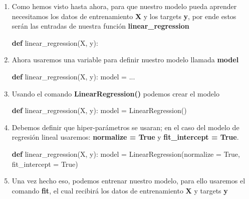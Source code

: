 \documentclass[11pt]{article}
\newenvironment{Shaded}{}{}
\newcommand{\KeywordTok}[1]{\textcolor[rgb]{0.00,0.44,0.13}{\textbf{{#1}}}}
\newcommand{\NormalTok}[1]{{#1}}
\newcommand{\VariableTok}[1]{\textcolor[rgb]{0.10,0.09,0.49}{{#1}}}
\newcommand{\OperatorTok}[1]{\textcolor[rgb]{0.40,0.40,0.40}{{#1}}}
\begin{document}
\begin{enumerate}
\def\labelenumi{\arabic{enumi}.}
\setcounter{enumi}{1}
\item
  Como hemos visto hasta ahora, para que nuestro modelo pueda aprender
  necesitamos los datos de entrenamiento \textbf{X} y los targets
  \textbf{y}, por ende estos serán las entradas de nuestra función
  \textbf{linear\_regression}

\begin{Shaded}
\begin{Highlighting}[]
\KeywordTok{def}\NormalTok{ linear_regression(X, y):}
\end{Highlighting}
\end{Shaded}
\item
  Ahora usaremos una variable para definir nuestro modelo llamada
  \textbf{model}

\begin{Shaded}
\begin{Highlighting}[]
\KeywordTok{def}\NormalTok{ linear_regression(X, y):}
\NormalTok{     model }\OperatorTok{=}\NormalTok{ ...}
\end{Highlighting}
\end{Shaded}
\item
  Usando el comando \textbf{LinearRegression()} podemos crear el modelo

\begin{Shaded}
\begin{Highlighting}[]
\KeywordTok{def}\NormalTok{ linear_regression(X, y):}
\NormalTok{     model }\OperatorTok{=}\NormalTok{ LinearRegression()}
\end{Highlighting}
\end{Shaded}
\item
  Debemos definir que hiper-parámetros se usaran; en el caso del modelo
  de regresión lineal usaremos: \textbf{normalize = True} y
  \textbf{fit\_intercept = True}.

\begin{Shaded}
\begin{Highlighting}[]
\KeywordTok{def}\NormalTok{ linear_regression(X, y):}
\NormalTok{     model }\OperatorTok{=}\NormalTok{ LinearRegression(normalize }\OperatorTok{=} \VariableTok{True}\NormalTok{, fit_intercept }\OperatorTok{=} \VariableTok{True}\NormalTok{)}
\end{Highlighting}
\end{Shaded}
\item
  Una vez hecho eso, podemos entrenar nuestro modelo, para ello usaremos
  el comando \textbf{fit}, el cual recibirá los datos de entrenamiento
  \textbf{X} y targets \textbf{y}


\end{enumerate}
\end{document}
